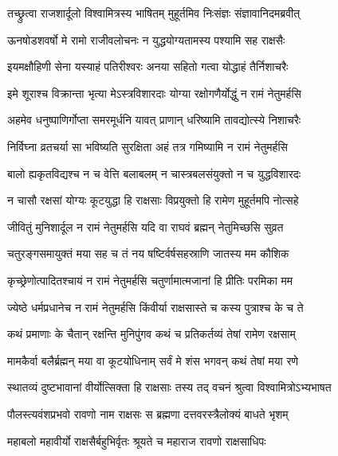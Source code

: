 
\twolineshloka
{तच्छ्रुत्वा राजशार्दूलो विश्वामित्रस्य भाषितम्}
{मुहूर्तमिव निःसंज्ञः संज्ञावानिदमब्रवीत्} %

\twolineshloka
{ऊनषोडशवर्षो मे रामो राजीवलोचनः}
{न युद्धयोग्यतामस्य पश्यामि सह राक्षसैः} %

\twolineshloka
{इयमक्षौहिणी सेना यस्याहं पतिरीश्वरः}
{अनया सहितो गत्वा योद्धाहं तैर्निशाचरैः} %

\twolineshloka
{इमे शूराश्च विक्रान्ता भृत्या मेऽस्त्रविशारदाः}
{योग्या रक्षोगणैर्योद्धुं न रामं नेतुमर्हसि} %

\twolineshloka
{अहमेव धनुष्पाणिर्गोप्ता समरमूर्धनि}
{यावत् प्राणान् धरिष्यामि तावद्योत्स्ये निशाचरैः} %

\twolineshloka
{निर्विघ्ना व्रतचर्या सा भविष्यति सुरक्षिता}
{अहं तत्र गमिष्यामि न रामं नेतुमर्हसि} %

\twolineshloka
{बालो ह्यकृतविद्यश्च न च वेत्ति बलाबलम्}
{न चास्त्रबलसंयुक्तो न च युद्धविशारदः} %

\twolineshloka
{न चासौ रक्षसां योग्यः कूटयुद्धा हि राक्षसाः}
{विप्रयुक्तो हि रामेण मुहूर्तमपि नोत्सहे} %

\twolineshloka
{जीवितुं मुनिशार्दूल न रामं नेतुमर्हसि}
{यदि वा राघवं ब्रह्मन् नेतुमिच्छसि सुव्रत} %

\twolineshloka
{चतुरङ्गसमायुक्तं मया सह च तं नय}
{षष्टिर्वर्षसहस्राणि जातस्य मम कौशिक} %

\twolineshloka
{कृच्छ्रेणोत्पादितश्चायं न रामं नेतुमर्हसि}
{चतुर्णामात्मजानां हि प्रीतिः परमिका मम} %

\twolineshloka
{ज्येष्ठे धर्मप्रधानेच न रामं नेतुमर्हसि}
{किंवीर्या राक्षसास्ते च कस्य पुत्राश्च के च ते} %

\twolineshloka
{कथं प्रमाणाः के चैतान् रक्षन्ति मुनिपुंगव}
{कथं च प्रतिकर्तव्यं तेषां रामेण रक्षसाम्} %

\twolineshloka
{मामकैर्वा बलैर्ब्रह्मन् मया वा कूटयोधिनाम्}
{सर्वं मे शंस भगवन् कथं तेषां मया रणे} %

\twolineshloka
{स्थातव्यं दुष्टभावानां वीर्योत्सिक्ता हि राक्षसाः}
{तस्य तद् वचनं श्रुत्वा विश्वामित्रोऽभ्यभाषत} %

\twolineshloka
{पौलस्त्यवंशप्रभवो रावणो नाम राक्षसः}
{स ब्रह्मणा दत्तवरस्त्रैलोक्यं बाधते भृशम्} %

\twolineshloka
{महाबलो महावीर्यो राक्षसैर्बहुभिर्वृतः}
{श्रूयते च महाराज रावणो राक्षसाधिपः} %


